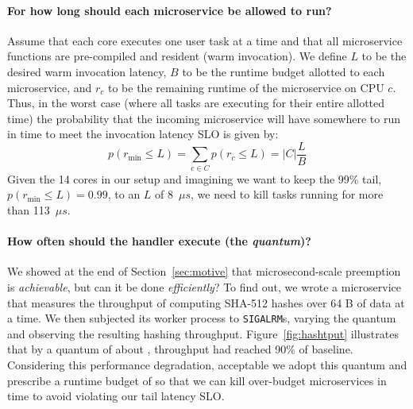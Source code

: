 \paragraph{For how long should each microservice be allowed to run?}
Assume that each core executes one user task at a
time and that all microservice
functions are pre-compiled and resident (warm invocation).
We define $L$ to be the desired warm invocation latency, $B$ to be the
runtime budget allotted to each microservice, and $r_c$ to be the remaining runtime
of the microservice on CPU $c$.  Thus, in the worst case (where all tasks are
executing for their entire allotted time) the probability that the incoming
microservice will have somewhere to run in time to meet the invocation
latency SLO is given by:
\begin{equation}
p(r_\textrm{min} \le L) = \sum\limits_{c \in C} p(r_c \le L) = \big| C \big| \frac{L}{B}
\end{equation}
Given the 14 cores in our setup and imagining we want to keep the 99\% tail,
$p(r_\textrm{min} \le L) = 0.99$, to an $L$ of 8~$\mu{}s$, we need to kill tasks
running for more than 113~$\mu{}s$.

\paragraph{How often should the handler execute (the \emph{quantum})?}
We showed at the end of Section~\ref{sec:motive} that microsecond-scale preemption is
\textit{achievable}, but can it be done \textit{efficiently}?  To find out, we wrote
a microservice that measures the throughput of computing SHA-512 hashes over 64 B of
data at a time.  We then subjected its worker process to \texttt{SIGALRM}s, varying
the quantum and observing the resulting hashing throughput.
Figure~\ref{fig:hashtput} illustrates that by a quantum of about ,
throughput had reached 90\% of baseline.  Considering this performance degradation,
acceptable we adopt this quantum and prescribe a runtime budget of  so
that we can kill over-budget microservices in time to avoid violating our tail
latency SLO.

